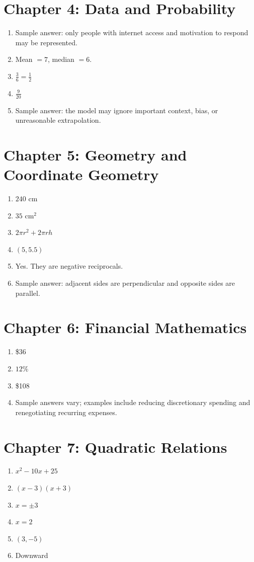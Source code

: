 \documentclass[11pt,oneside]{book}
\begin{document}
\section*{Chapter 4: Data and Probability}
\begin{enumerate}
  \item Sample answer: only people with internet access and motivation to respond may be represented.
  \item Mean $=7$, median $=6$.
  \item $\frac{3}{6}=\frac{1}{2}$
  \item $\frac{9}{20}$
  \item Sample answer: the model may ignore important context, bias, or unreasonable extrapolation.
\end{enumerate}

\section*{Chapter 5: Geometry and Coordinate Geometry}
\begin{enumerate}
  \item $240$ cm
  \item $35\text{ cm}^2$
  \item $2\pi r^2+2\pi rh$
  \item $(5,5.5)$
  \item Yes. They are negative reciprocals.
  \item Sample answer: adjacent sides are perpendicular and opposite sides are parallel.
\end{enumerate}

\section*{Chapter 6: Financial Mathematics}
\begin{enumerate}
  \item \$36
  \item $12\%$
  \item \$108
  \item Sample answers vary; examples include reducing discretionary spending and renegotiating recurring expenses.
\end{enumerate}

\section*{Chapter 7: Quadratic Relations}
\begin{enumerate}
  \item $x^2-10x+25$
  \item $(x-3)(x+3)$
  \item $x=\pm 3$
  \item $x=2$
  \item $(3,-5)$
  \item Downward
\end{enumerate}
\end{document}
